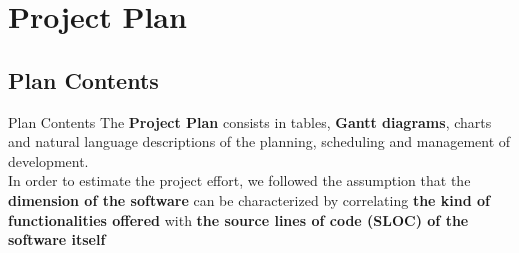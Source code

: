 \documentclass{../Common/Structure/pdf_presentation}
\begin{document}
	\section{Project Plan}
	\subsection{Plan Contents}
	\begin{frame}{Plan Contents}
		The \textbf{Project Plan} consists in tables, \textbf{Gantt diagrams}, charts and natural language descriptions of the planning, scheduling and management of \PowerEnJoy{} development. \\
		\medskip
		In order to estimate the project effort, we followed the assumption that the \textbf{dimension of the software} can be characterized by correlating \textbf{the kind of functionalities offered} with \textbf{the source lines of code (SLOC) of the software itself}
	\end{frame}
\end{document}

